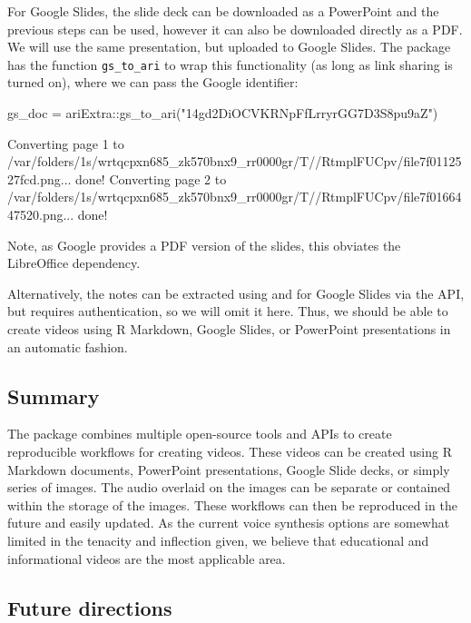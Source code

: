 For Google Slides, the slide deck can be downloaded as a PowerPoint and
the previous steps can be used, however it can also be downloaded
directly as a PDF. We will use the same presentation, but uploaded to
Google Slides. The  package has the function
\texttt{gs\_to\_ari} to wrap this functionality (as long as link sharing
is turned on), where we can pass the Google identifier:

\begin{Schunk}
\begin{Sinput}
gs_doc = ariExtra::gs_to_ari("14gd2DiOCVKRNpFfLrryrGG7D3S8pu9aZ")
\end{Sinput}
\begin{Soutput}
Converting page 1 to /var/folders/1s/wrtqcpxn685_zk570bnx9_rr0000gr/T//RtmplFUCpv/file7f0112527fcd.png... done!
Converting page 2 to /var/folders/1s/wrtqcpxn685_zk570bnx9_rr0000gr/T//RtmplFUCpv/file7f0166447520.png... done!
\end{Soutput}
\end{Schunk}

Note, as Google provides a PDF version of the slides, this obviates the
LibreOffice dependency.

Alternatively, the notes can be extracted using  and
for Google Slides via the API, but requires authentication, so we will
omit it here. Thus, we should be able to create videos using R Markdown,
Google Slides, or PowerPoint presentations in an automatic fashion.

\hypertarget{summary}{%
\subsection{Summary}\label{summary}}

The  package combines multiple open-source tools and APIs to
create reproducible workflows for creating videos. These videos can be
created using R Markdown documents, PowerPoint presentations, Google
Slide decks, or simply series of images. The audio overlaid on the
images can be separate or contained within the storage of the images.
These workflows can then be reproduced in the future and easily updated.
As the current voice synthesis options are somewhat limited in the
tenacity and inflection given, we believe that educational and
informational videos are the most applicable area.

\hypertarget{future-directions}{%
\subsection{Future directions}\label{future-directions}}

